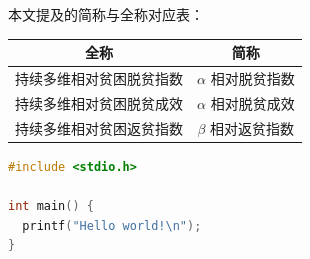 本文提及的简称与全称对应表：

\begin{table}[h]
\centering
\begin{tabular}{|c|c|}
  \hline
  全称 & 简称 \\
  \hline
  持续多维相对贫困脱贫指数 & $\alpha$ 相对脱贫指数 \\
  \hline
  持续多维相对贫困脱贫成效 & $\alpha$ 相对脱贫成效 \\
  \hline
  持续多维相对贫困返贫指数 & $\beta$ 相对返贫指数 \\
  \hline
\end{tabular}
\end{table}

\begin{lstlisting}[language=c]
#include <stdio.h>

int main() {
  printf("Hello world!\n");
}
\end{lstlisting}
